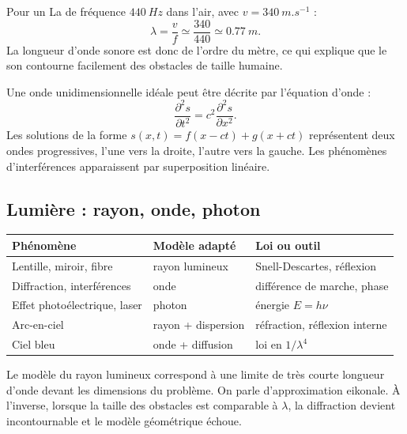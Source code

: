 \documentclass[11pt,a4paper]{article}
\begin{document}
\begin{exemplebox}
Pour un La de fréquence $\SI{440}{Hz}$ dans l'air, avec $v=\SI{340}{m.s^{-1}}$ :
\[
\lambda=\frac{v}{f}\simeq \frac{340}{440}\simeq \SI{0.77}{m}.
\]
La longueur d'onde sonore est donc de l'ordre du mètre, ce qui explique que le son contourne facilement des obstacles de taille humaine.
\end{exemplebox}

\begin{approfondissementbox}
Une onde unidimensionnelle idéale peut être décrite par l'équation d'onde :
\[
\frac{\partial^2 s}{\partial t^2}=c^2\frac{\partial^2 s}{\partial x^2}.
\]
Les solutions de la forme $s(x,t)=f(x-ct)+g(x+ct)$ représentent deux ondes progressives, l'une vers la droite, l'autre vers la gauche. Les phénomènes d'interférences apparaissent par superposition linéaire.
\end{approfondissementbox}

\subsection{Lumière : rayon, onde, photon}

\begin{methodebox}
\begin{center}
\begin{tabularx}{\textwidth}{p{4cm}p{4cm}X}
\toprule
Phénomène & Modèle adapté & Loi ou outil\\
\midrule
Lentille, miroir, fibre & rayon lumineux & Snell-Descartes, réflexion\\
Diffraction, interférences & onde & différence de marche, phase\\
Effet photoélectrique, laser & photon & énergie $E=h\nu$\\
Arc-en-ciel & rayon + dispersion & réfraction, réflexion interne\\
Ciel bleu & onde + diffusion & loi en $1/\lambda^4$\\
\bottomrule
\end{tabularx}
\end{center}
\end{methodebox}

\begin{approfondissementbox}
Le modèle du rayon lumineux correspond à une limite de très courte longueur d'onde devant les dimensions du problème. On parle d'approximation eikonale. À l'inverse, lorsque la taille des obstacles est comparable à $\lambda$, la diffraction devient incontournable et le modèle géométrique échoue.
\end{approfondissementbox}
\end{document}
